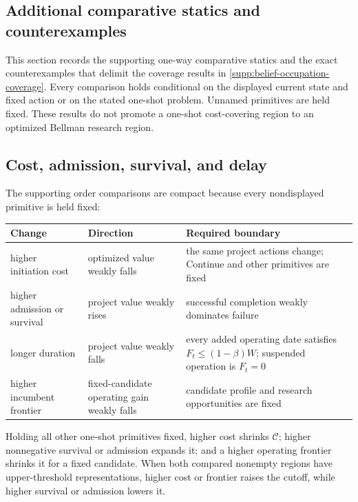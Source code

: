 \subsection{Additional comparative statics and counterexamples}
\label{supp:additional-comparative-statics}\label{app:counterexamples}

This section records the supporting one-way comparative statics and the exact
counterexamples that delimit the coverage results in
\cref{supp:belief-occupation-coverage}.  Every comparison holds conditional
on the displayed current state and fixed action or on the stated one-shot
problem.  Unnamed primitives are held fixed.  These results do not promote a
one-shot cost-covering region to an optimized Bellman research region.

\subsection{Cost, admission, survival, and delay}

The supporting order comparisons are compact because every nondisplayed
primitive is held fixed:
\begin{center}
\small
\renewcommand{\arraystretch}{1.08}
\begin{tabular}{@{}>{\raggedright\arraybackslash}p{}
                    >{\raggedright\arraybackslash}p{}
                    >{\raggedright\arraybackslash}p{}@{}}
\toprule
Change & Direction & Required boundary \\
\midrule
higher initiation cost
  & optimized value weakly falls
  & the same project actions change; Continue and other primitives are fixed \\
higher admission or survival
  & project value weakly rises
  & successful completion weakly dominates failure \\
longer duration
  & project value weakly falls
  & every added operating date satisfies
    \(F_t\le(1-\beta)W\); suspended operation is \(F_t=0\) \\
higher incumbent frontier
  & fixed-candidate operating gain weakly falls
  & candidate profile and research opportunities are fixed \\
\bottomrule
\end{tabular}
\end{center}

\begin{proposition}
\label{prop:one-shot-cutoff-comparative-statics}
Holding all other one-shot primitives fixed, higher cost shrinks
\(\mathcal C\); higher nonnegative survival or admission expands it; and a
higher operating frontier shrinks it for a fixed candidate.  When both
compared nonempty regions have upper-threshold representations, higher cost
or frontier raises the cutoff, while higher survival or admission lowers it.
\end{proposition}

